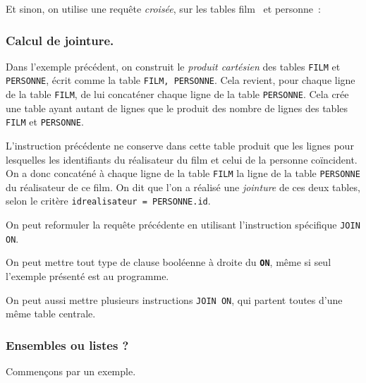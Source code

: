 Et sinon, on utilise une requête \emph{croisée}, sur les tables \og film \fg\ et \og personne\fg\ :

\begin{center}
\end{center}


% 

\subsubsection{Calcul de jointure.}

Dans l'exemple précédent, on construit le \emph{produit cartésien} des tables \texttt{FILM} et \texttt{PERSONNE}, écrit comme la table \texttt{FILM, PERSONNE}. 
Cela revient, pour chaque ligne de la table \texttt{FILM}, de lui concaténer chaque ligne de la table \texttt{PERSONNE}. 
Cela crée une table ayant autant de lignes que le produit des nombre de lignes des tables \texttt{FILM} et \texttt{PERSONNE}.

L'instruction précédente ne conserve dans cette table produit que les lignes pour lesquelles les identifiants du réalisateur du film et celui de la personne coïncident. 
On a donc concaténé à chaque ligne de la table \texttt{FILM} la ligne de la table \texttt{PERSONNE} du réalisateur de ce film. 
On dit que l'on a réalisé une \emph{jointure} de ces deux tables, selon le critère \texttt{idrealisateur = PERSONNE.id}. 

On peut reformuler la requête précédente en utilisant l'instruction spécifique \texttt{JOIN ON}.

\begin{center}
\end{center}

\begin{rem}
  On peut mettre tout type de clause booléenne à droite du \textbf{\texttt{ON}}, même si seul l'exemple présenté est au programme. 
  
  On peut aussi mettre plusieurs instructions \texttt{JOIN ON}, qui partent toutes d'une même table centrale. 
\end{rem}


\subsubsection{Ensembles ou listes ?}
Commençons par un exemple. 

\begin{center}
\end{center}

